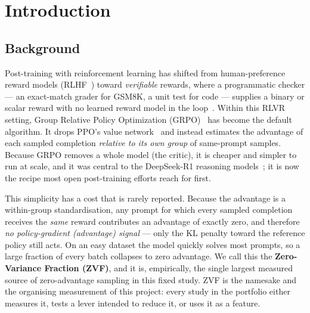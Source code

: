 \chapter{Introduction}
\label{ch:intro}

\section{Background}
Post-training with reinforcement learning has shifted from human-preference reward
models (RLHF~\cite{ouyang2022instructgpt}) toward \emph{verifiable} rewards, where
a programmatic checker --- an exact-match grader for GSM8K, a unit test for code
--- supplies a binary or scalar reward with no learned reward model in the
loop~\cite{lambert2024tulu3,guo2025r1}. Within this RLVR setting, Group Relative
Policy Optimization (GRPO)~\cite{shao2024deepseekmath} has become the default
algorithm. It drops PPO's value network~\cite{schulman2017ppo} and instead
estimates the advantage of each sampled completion \emph{relative to its own group}
of same-prompt samples. Because GRPO removes a whole model (the critic), it is
cheaper and simpler to run at scale, and it was central to the DeepSeek-R1
reasoning models~\cite{guo2025r1}; it is now the recipe most open post-training
efforts reach for first.

This simplicity has a cost that is rarely reported. Because the advantage is a
within-group standardisation, any prompt for which every sampled completion
receives the \emph{same} reward contributes an advantage of exactly zero, and
therefore \emph{no policy-gradient (advantage) signal} --- only the KL penalty
toward the reference policy still acts. On an easy dataset the model quickly solves most
prompts, so a large fraction of every batch collapses to zero advantage. We call
this the \textbf{Zero-Variance Fraction (ZVF)}, and it is, empirically, the single
largest measured source of zero-advantage sampling in this fixed study. ZVF is the namesake and the
organising measurement of this project: every study in the portfolio either
measures it, tests a lever intended to reduce it, or uses it as a feature.

